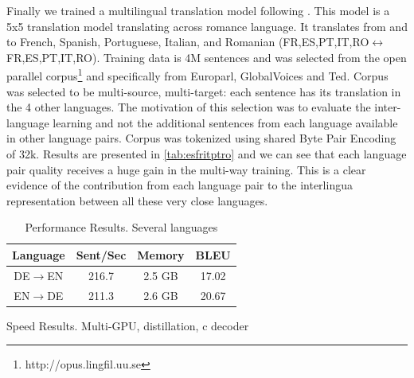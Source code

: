 \documentclass[11pt]{article}
\begin{document}
Finally we trained a multilingual translation model following . This model is a 5x5 translation 
model translating across romance language. It translates from and to 
French, Spanish, Portuguese, Italian, and Romanian (FR,ES,PT,IT,RO$\leftrightarrow$FR,ES,PT,IT,RO). Training data is 4M sentences and was selected from the open parallel corpus\footnote{http://opus.lingfil.uu.se} and specifically from Europarl, GlobalVoices and Ted. Corpus was selected to be multi-source, multi-target: each sentence has its translation in the 4 other languages. The motivation of this selection was to evaluate the inter-language learning and not the additional sentences from each language available in other language pairs. Corpus was tokenized using shared Byte Pair Encoding of 32k.
Results are presented in \ref{tab:esfritptro} and we can see that each language pair quality receives a huge gain in the multi-way training. This is a clear evidence of the contribution from each language pair to the interlingua representation between all these very close languages.









\begin{table}
  \centering
  \begin{tabular}{cccc}
    \toprule
     Language & Sent/Sec & Memory & BLEU \\
    \midrule
    DE$\rightarrow$EN& 216.7 & 2.5 GB & 17.02\\
    EN$\rightarrow$DE& 211.3 & 2.6 GB & 20.67 \\
    \midrule

    \bottomrule
  \end{tabular}
  \label{tab:res}
  \caption{Performance Results. Several languages}
\end{table}


\begin{table}
  \centering
  
  \caption{Speed Results. Multi-GPU, distillation, c decoder}
\end{table}
\end{document}
